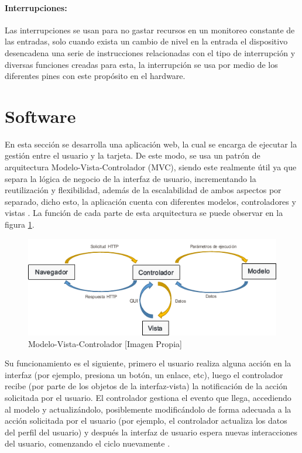 \paragraph{Interrupciones:}

Las interrupciones se usan para no gastar recursos en un monitoreo constante de las entradas, solo cuando exista un cambio de nivel en la entrada el dispositivo desencadena una serie de instrucciones relacionadas con el tipo de interrupción y diversas funciones creadas para esta, la interrupción se usa por medio de los diferentes pines con este propósito en el hardware.

\section{Software}

En esta sección se desarrolla una aplicación web, la cual se encarga de ejecutar la gestión entre el usuario y la tarjeta. De este modo, se usa un patrón de arquitectura Modelo-Vista-Controlador (MVC), siendo este realmente útil ya que separa la lógica de negocio de la interfaz de usuario, incrementando la reutilización y flexibilidad, además de la escalabilidad de ambos aspectos por separado, dicho esto, la aplicación cuenta con diferentes modelos, controladores y vistas \cite{MVC1}. La función de cada parte de esta arquitectura se puede observar en la figura \ref{fig:mvc}.\\

\begin{figure}[H]
	\centering
	\caption{Modelo-Vista-Controlador [Imagen Propia]}
	\label{fig:mvc}
	\includegraphics[width=0.7\linewidth]{Imagenes/MVC}
\end{figure}


Su funcionamiento es el siguiente, primero el usuario realiza alguna acción en la interfaz (por ejemplo, presiona un botón, un enlace, etc), luego el controlador recibe (por parte de los objetos de la interfaz-vista) la notificación de la acción solicitada por el usuario. El controlador gestiona el evento que llega, accediendo al modelo y actualizándolo, posiblemente modificándolo de forma adecuada a la acción solicitada por el usuario (por ejemplo, el controlador actualiza los datos del perfil del usuario) y después la interfaz de usuario espera nuevas interacciones del usuario, comenzando el ciclo nuevamente \cite{MVC2}.\\

